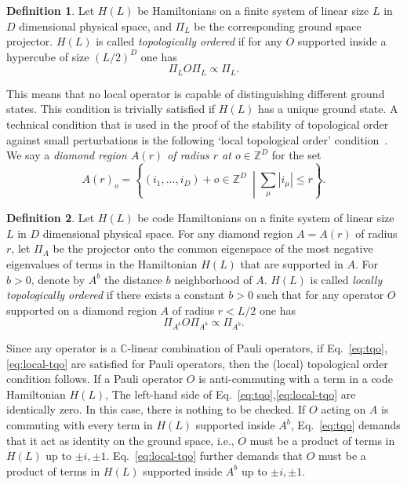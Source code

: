 \documentclass[letterpaper,12pt]{amsart}
\theoremstyle{definition} \newtheorem{defn}{Definition}
\theoremstyle{definition} \newtheorem{rem}{Remark}
\theoremstyle{definition} \newtheorem{example}{Example}
\newcommand{\ZZ}{\mathbb{Z}}
\begin{document}
\begin{defn}
Let $H(L)$ be Hamiltonians on a finite system of linear size $L$
in $D$ dimensional physical space,
and $\Pi_L$ be the corresponding ground space projector.
$H(L)$ is called {\em topologically ordered} if
for any $O$ supported inside a hypercube of size $(L/2)^D$
one has
\begin{equation}
 \Pi_L O \Pi_L \propto \Pi_L .
\label{eq:tqo}
\end{equation}
\end{defn}
This means that no local operator is capable of distinguishing different ground states.
This condition is trivially satisfied if $H(L)$ has a unique ground state.
A technical condition that is used in the proof of the stability of topological order
against small perturbations is the following `local topological order'
condition~\cite{MichalakisPytel2011stability,
BravyiHastingsMichalakis2010stability,
BravyiHastings2011short}.
We say a {\em diamond region $A(r)$ of radius $r$ at $o \in \ZZ^D$} for the set
\[
 A(r)_o = \left\{ (i_1,\ldots,i_D) + o \in \ZZ^D ~\middle| \sum_\mu |i_\mu| \le r \right\} .
\]
\begin{defn}
Let $H(L)$ be code Hamiltonians on a finite system of linear size $L$
in $D$ dimensional physical space.
For any diamond region $A=A(r)$ of radius $r$,
let $\Pi_A$ be the projector onto the common eigenspace of the most negative eigenvalues of terms
in the Hamiltonian $H(L)$ that are supported in $A$.
For $b > 0$, denote by $A^b$ the distance $b$ neighborhood of $A$.
$H(L)$ is called {\em locally topologically ordered} if
there exists a constant $b > 0$ such that
for any operator $O$ supported on a diamond region $A$ of radius $r < L/2$
one has
\begin{equation}
 \Pi_{A^b} O \Pi_{A^b} \propto \Pi_{A^b} .
\label{eq:local-tqo}
\end{equation}
\end{defn}
Since any operator is a $\mathbb{C}$-linear combination of Pauli operators,
if Eq.~\eqref{eq:tqo},\eqref{eq:local-tqo} are satisfied for Pauli operators,
then the (local) topological order condition follows.
If a Pauli operator $O$ is anti-commuting with a term in a code Hamiltonian $H(L)$,
The left-hand side of Eq.~\eqref{eq:tqo},\eqref{eq:local-tqo} are identically zero.
In this case, there is nothing to be checked.
If $O$ acting on $A$ is commuting with every term in $H(L)$ supported inside $A^b$,
Eq.~\eqref{eq:tqo} demands that it act as identity on the ground space,
i.e., $O$ must be a product of terms in $H(L)$ up to $\pm i,\pm 1$.
Eq.~\eqref{eq:local-tqo} further demands that
$O$ must be a product of terms in $H(L)$ supported inside $A^b$ up to $\pm i,\pm 1$.
\end{document}
